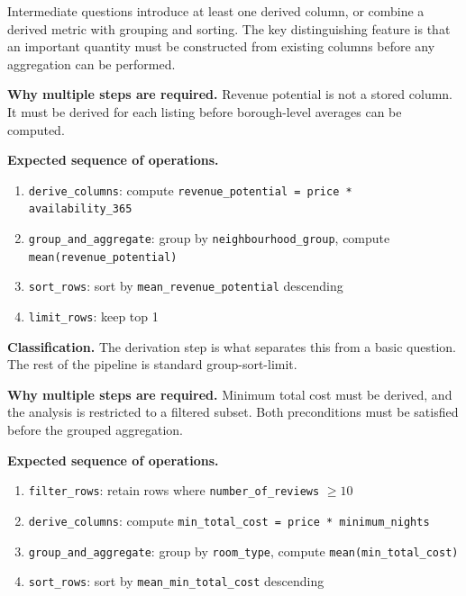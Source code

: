 Intermediate questions introduce at least one derived column, or combine a derived metric with grouping and sorting. The key distinguishing feature is that an important quantity must be constructed from existing columns before any aggregation can be performed.


\textbf{Why multiple steps are required.}
Revenue potential is not a stored column. It must be derived for each listing before borough-level averages can be computed.

\textbf{Expected sequence of operations.}
\begin{enumerate}
  \item \texttt{derive\_columns}: compute
    \texttt{revenue\_potential = price * availability\_365}
  \item \texttt{group\_and\_aggregate}: group by \texttt{neighbourhood\_group},
    compute \texttt{mean(revenue\_potential)}
  \item \texttt{sort\_rows}: sort by \texttt{mean\_revenue\_potential} descending
  \item \texttt{limit\_rows}: keep top 1
\end{enumerate}

\textbf{Classification.}
The derivation step is what separates this from a basic question. The rest of the pipeline is standard group-sort-limit.



\textbf{Why multiple steps are required.}
Minimum total cost must be derived, and the analysis is restricted to a filtered subset. Both preconditions must be satisfied before the grouped aggregation.

\textbf{Expected sequence of operations.}
\begin{enumerate}
  \item \texttt{filter\_rows}: retain rows where \texttt{number\_of\_reviews}
    $\geq 10$
  \item \texttt{derive\_columns}: compute
    \texttt{min\_total\_cost = price * minimum\_nights}
  \item \texttt{group\_and\_aggregate}: group by \texttt{room\_type}, compute
    \texttt{mean(min\_total\_cost)}
  \item \texttt{sort\_rows}: sort by \texttt{mean\_min\_total\_cost} descending
\end{enumerate}

